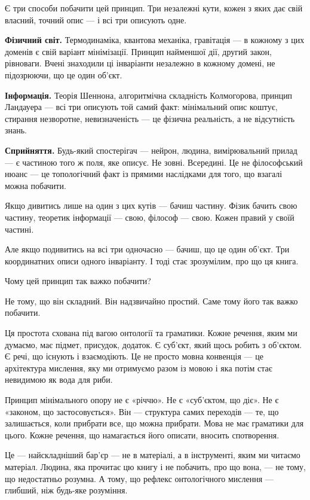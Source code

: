 \documentclass[12pt, a4paper, openany]{book}
\begin{document}
\bigskip

Є три способи побачити цей принцип. Три незалежні кути, кожен з яких дає свій власний, точний опис — і всі три описують одне.

\textbf{Фізичний світ.} Термодинаміка, квантова механіка, гравітація — в кожному з цих доменів є свій варіант мінімізації. Принцип найменшої дії, другий закон, рівноваги. Вчені знаходили ці інваріанти незалежно в кожному домені, не підозрюючи, що це один об'єкт.

\textbf{Інформація.} Теорія Шеннона, алгоритмічна складність Колмогорова, принцип Ландауера — всі три описують той самий факт: мінімальний опис коштує, стирання незворотне, невизначеність — це фізична реальність, а не відсутність знань.

\textbf{Сприйняття.} Будь-який спостерігач — нейрон, людина, вимірювальний прилад — є частиною того ж поля, яке описує. Не зовні. Всередині. Це не філософський нюанс — це топологічний факт із прямими наслідками для того, що взагалі можна побачити.

Якщо дивитись лише на один з цих кутів — бачиш частину. Фізик бачить свою частину, теоретик інформації — свою, філософ — свою. Кожен правий у своїй частині.

Але якщо подивитись на всі три одночасно — бачиш, що це один об'єкт. Три координатних описи одного інваріанту. І тоді стає зрозумілим, про що ця книга.

\bigskip

Чому цей принцип так важко побачити?

Не тому, що він складний. Він надзвичайно простий. Саме тому його так важко побачити.

Ця простота схована під вагою онтології та граматики. Кожне речення, яким ми думаємо, має підмет, присудок, додаток. Є суб'єкт, який щось робить з об'єктом. Є речі, що існують і взаємодіють. Це не просто мовна конвенція — це архітектура мислення, яку ми отримуємо разом із мовою і яка потім стає невидимою як вода для риби.

Принцип мінімального опору не є «річчю». Не є «суб'єктом, що діє». Не є «законом, що застосовується». Він — структура самих переходів — те, що залишається, коли прибрати все, що можна прибрати. Мова не має граматики для цього. Кожне речення, що намагається його описати, вносить спотворення.

Це — найскладніший бар'єр — не в матеріалі, а в інструменті, яким ми читаємо матеріал. Людина, яка прочитає цю книгу і не побачить, про що вона, — не тому, що недостатньо розумна. А тому, що рефлекс онтологічного мислення — глибший, ніж будь-яке розуміння.
\end{document}
